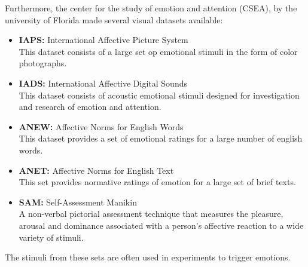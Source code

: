 Furthermore, the center for the study of emotion and attention (CSEA), by the university of Florida made several visual datasets available:
\begin{itemize}
\item \textbf{IAPS:} International Affective Picture System\\
This dataset consists of a large set op emotional stimuli in the form of color photographs.
\item \textbf{IADS:} International Affective Digital Sounds \\
This dataset consists of acoustic emotional stimuli designed for investigation and research of emotion and attention.
\item \textbf{ANEW:} Affective Norms for English Words\\
This dataset provides a set of emotional ratings for a large number of english words.
\item \textbf{ANET:} Affective Norms for English Text\\
This set provides normative ratings of emotion for a large set of brief texts.
\item \textbf{SAM:} Self-Assessment Manikin\\
A non-verbal pictorial assessment technique that measures the pleasure, arousal and dominance associated with a person's affective reaction to a wide variety of stimuli.
\end{itemize}
The stimuli from these sets are often used in experiments to trigger emotions\cite{ExtendedPaper}\cite{EmotionSite}\cite{RealTimeEEGEmotion}\cite{EEGDatasets}.
